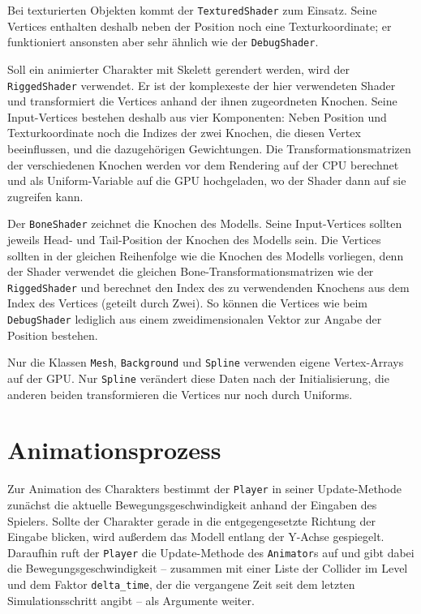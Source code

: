 Bei texturierten Objekten kommt der \lstinline{TexturedShader} zum Einsatz. Seine Vertices enthalten deshalb neben der Position noch eine Texturkoordinate; er funktioniert ansonsten aber sehr ähnlich wie der \lstinline{DebugShader}.

Soll ein animierter Charakter mit Skelett gerendert werden, wird der \lstinline{RiggedShader} verwendet. Er ist der komplexeste der hier verwendeten Shader und transformiert die Vertices anhand der ihnen zugeordneten Knochen. Seine Input-Vertices bestehen deshalb aus vier Komponenten: Neben Position und Texturkoordinate noch die Indizes der zwei Knochen, die diesen Vertex beeinflussen, und die dazugehörigen Gewichtungen. Die Transformationsmatrizen der verschiedenen Knochen werden vor dem Rendering auf der CPU berechnet und als Uniform-Variable auf die GPU hochgeladen, wo der Shader dann auf sie zugreifen kann.

Der \lstinline{BoneShader} zeichnet die Knochen des Modells. Seine Input-Vertices sollten jeweils Head- und Tail-Position der Knochen des Modells sein. Die Vertices sollten in der gleichen Reihenfolge wie die Knochen des Modells vorliegen, denn der Shader verwendet die gleichen Bone-Transformationsmatrizen wie der \lstinline{RiggedShader} und berechnet den Index des zu verwendenden Knochens aus dem Index des Vertices (geteilt durch Zwei). So können die Vertices wie beim \lstinline{DebugShader} lediglich aus einem zweidimensionalen Vektor zur Angabe der Position bestehen.

Nur die Klassen \lstinline{Mesh}, \lstinline{Background} und \lstinline{Spline} verwenden eigene Vertex-Arrays auf der GPU. Nur \lstinline{Spline} verändert diese Daten nach der Initialisierung, die anderen beiden transformieren die Vertices nur noch durch Uniforms.

\section{Animationsprozess} \label{animator_section}
Zur Animation des Charakters bestimmt der \lstinline{Player} in seiner Update-Methode zunächst die aktuelle Bewegungsgeschwindigkeit anhand der Eingaben des Spielers. Sollte der Charakter gerade in die entgegengesetzte Richtung der Eingabe blicken, wird außerdem das Modell entlang der Y-Achse gespiegelt. Daraufhin ruft der \lstinline{Player} die Update-Methode des \lstinline{Animator}s auf und gibt dabei die Bewegungsgeschwindigkeit -- zusammen mit einer Liste der Collider im Level und dem Faktor \lstinline{delta_time}, der die vergangene Zeit seit dem letzten Simulationsschritt angibt -- als Argumente weiter.

